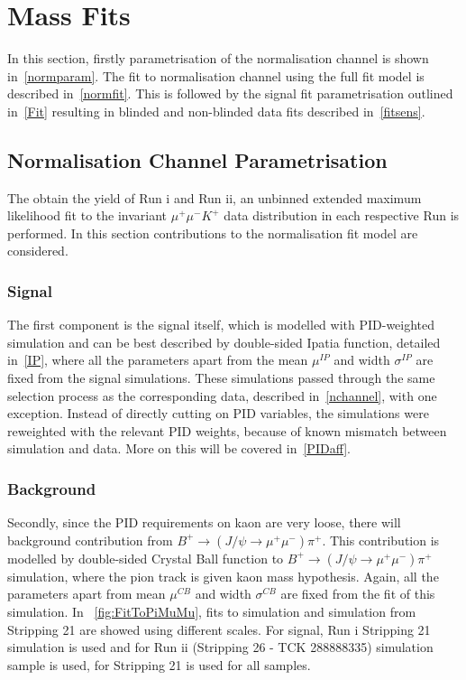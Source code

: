 \newpage
\section{Mass Fits}
In this section, firstly parametrisation of the normalisation channel is shown in~\autoref{normparam}. The fit to normalisation channel using the full fit model is described in~\autoref{normfit}. This is followed by the signal fit parametrisation outlined in~\autoref{Fit} resulting in blinded and non-blinded data fits described in~\autoref{fitsens}.

\subsection{Normalisation Channel Parametrisation}
\label{normparam}

The obtain the \bjpsimumuk yield of Run \Rn{1} and Run \Rn{2}, an unbinned extended maximum likelihood fit to the invariant $\mu^{+} \mu^{-} K^{+}$ data distribution in each respective Run is performed. In this section contributions to the normalisation fit model are considered. 

\subsubsection{Signal}

The first component is the signal itself, which is modelled with PID-weighted simulation and can be best described by double-sided Ipatia function, detailed in~\autoref{IP}, where all the parameters apart from the mean $\mu^{IP}$ and width $\sigma^{IP}$ are fixed from the signal simulations. These simulations passed through the same selection process as the corresponding \bjpsimumuk data, described in~\autoref{nchannel}, with one exception. Instead of directly cutting on \gls{PID} variables, the simulations were reweighted with the relevant PID weights, because of known mismatch between simulation and data. More on this will be covered in~\autoref{PIDaff}. 


\subsubsection{\mb{\bjpsimumupi} Background}

Secondly, since the PID requirements on kaon are very loose, there will background contribution from $ B^{+} \rightarrow (J/\psi \rightarrow \mu^{+} \mu^{-}) \pi^{+}$. This contribution is modelled by double-sided Crystal Ball function to $B^{+} \rightarrow (J/\psi \rightarrow \mu^{+} \mu^{-}) \pi^{+}$ simulation, where the pion track is given kaon mass hypothesis. Again, all the parameters apart from mean $\mu^{CB}$ and width $\sigma^{CB}$ are fixed from the fit of this simulation. In ~\autoref{fig:FitToPiMuMu}, fits to \bjpsimumuk simulation and \bjpsimumupi simulation from Stripping 21 are showed using different scales.
For signal, Run \Rn{1} Stripping 21 simulation is used and for Run \Rn{2} (Stripping 26 - TCK 288888335) simulation sample is used, for \bjpsimumupi Stripping 21 is used for all samples.

